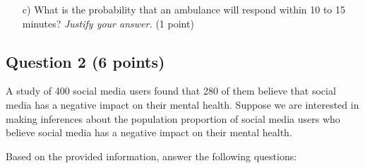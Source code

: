 \documentclass{article}
\begin{document}
\begin{enumerate}
\item[c)] What is the probability that an ambulance will respond within 10 to 15 minutes? \emph{Justify your answer.} (1 point)

\begin{center}
\end{center}

\end{enumerate}

\subsection*{Question 2 (6 points)}
A study of 400 social media users found that 280 of them believe that social media has a negative impact on their mental health. Suppose we are interested in making inferences about the population proportion of social media users who believe social media has a negative impact on their mental health.

Based on the provided information, answer the following questions:
\end{document}
